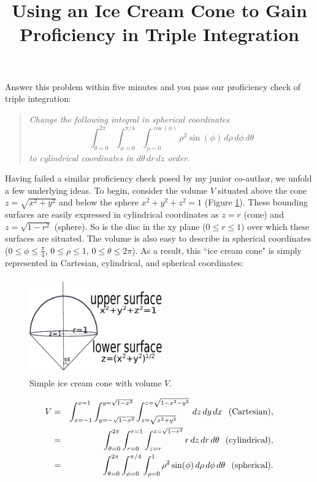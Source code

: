 \documentclass[12pt,fleqn]{article}
\title{Using an Ice Cream Cone to Gain Proficiency in Triple Integration}
\author{}
\date{}
\begin{document}
\maketitle
\doublespacing
             Answer this problem within five minutes and you pass our proficiency check of triple integration:

\begin{quote}
\emph{Change the following integral in spherical coordinates
\begin{displaymath}
\int_{\theta=0}^{2\pi}\int_{\phi=0}^{\pi/4} \int_{\rho=0}^{\cos(\phi)} \rho^2\sin(\phi) \,d\rho\,d\phi\,d\theta
 \end{displaymath}
 {\flushleft to} cylindrical coordinates in $d\theta\,dr\,dz$ order.}
\end{quote}

Having failed a similar proficiency check posed by my junior co-author, we  unfold a few underlying ideas.
    To begin, consider the volume $V$ situated above the cone $z=\sqrt{x^2+y^2}$ and below the sphere $x^2+y^2+z^2=1$ (Figure \ref{ic1}).   These bounding surfaces are easily expressed in cylindrical coordinates as $z=r$ (cone) and $z=\sqrt{1-r^2}$ (sphere). So is the disc in the xy plane ($0\le r\le1$) over which these surfaces are situated. The volume is also easy to describe in spherical coordinates ($0\le \phi\le \frac{\pi}{4}$, $0\le \rho \le 1$, $0\le\theta\le 2\pi$).  As a result, this ``ice cream cone" is simply represented in Cartesian, cylindrical, and spherical coordinates:
              \begin{figure}[!htpb]
    \centering
        \includegraphics [width=2.25in, height=1.65in]{ic1.eps}
    \caption{Simple ice cream cone with volume $V$.}
    \label{ic1}
\end{figure}


\begin{eqnarray*}
V &= &  \int_{x=-1}^{x=1} \int_{y=-\sqrt{1-x^2}}^{y=\sqrt{1-x^2}}\int_{z=\sqrt{x^2+y^2}}^{z=\sqrt{1-x^2-y^2}}\,dz\,dy\,dx  \hspace{.1in} \textup{(Cartesian),}\\
&=&\int_{\theta=0}^{2\pi}\int_{r=0}^{r=1} \int_{z=r}^{z=\sqrt{1-r^2}} r \,dz\,dr\,d\theta \hspace{.1in} \textup{(cylindrical),}\\
& = &\int_{\theta=0}^{2\pi}\int_{\phi=0}^{\pi/4} \int_{\rho=0}^{1} \rho^2\sin(\phi) \,d\rho\,d\phi\,d\theta \hspace{.1in} \textup{(spherical)}.
\end{eqnarray*}
\end{document}
